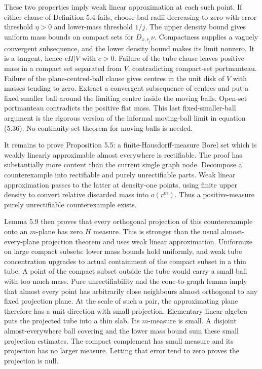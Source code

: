 These two properties imply weak linear approximation at each such point.
If either clause of Definition 5.4 fails, choose bad radii decreasing to zero
with error threshold $\eta>0$ and lower-mass threshold $1/j$.
The upper density bound gives uniform mass bounds on compact sets for
$D_{x,r_j}\nu$. Compactness supplies a vaguely convergent subsequence, and
the lower density bound makes its limit nonzero. It is a tangent, hence
$cH|V$ with $c>0$. Failure of the tube clause leaves positive mass in a
compact set separated from $V$, contradicting compact-set portmanteau.
Failure of the plane-centred-ball clause gives centres in the unit disk of
$V$ with masses tending to zero. Extract a convergent subsequence of centres
and put a fixed smaller ball around the limiting centre inside the moving
balls. Open-set portmanteau contradicts the positive flat mass. This last
fixed-smaller-ball argument is the rigorous version of the informal moving-ball
limit in equation (5.36). No continuity-set theorem for moving balls is needed.

It remains to prove Proposition 5.5: a finite-Hausdorff-measure Borel set
which is weakly linearly approximable almost everywhere is rectifiable.
The proof has substantially more content than the current single graph node.
Decompose a counterexample into rectifiable and purely unrectifiable parts.
Weak linear approximation passes to the latter at density-one points,
using finite upper density to convert relative discarded mass into $o(r^m)$.
Thus a positive-measure purely unrectifiable counterexample exists.

Lemma 5.9 then proves that every orthogonal projection of this counterexample
onto an $m$-plane has zero $H$ measure. This is stronger than the usual
almost-every-plane projection theorem and uses weak linear approximation.
Uniformize on large compact subsets: lower mass bounds hold uniformly, and
weak tube concentration upgrades to actual containment of the compact subset
in a thin tube. A point of the compact subset outside the tube would carry a
small ball with too much mass. Pure unrectifiability and the cone-to-graph
lemma imply that almost every point has arbitrarily close neighbours almost
orthogonal to any fixed projection plane. At the scale of such a pair, the
approximating plane therefore has a unit direction with small projection.
Elementary linear algebra puts the projected tube into a thin slab. Its
$m$-measure is small. A disjoint almost-everywhere ball covering and the lower
mass bound sum these small projection estimates. The compact complement has
small measure and its projection has no larger measure. Letting that error
tend to zero proves the projection is null.

